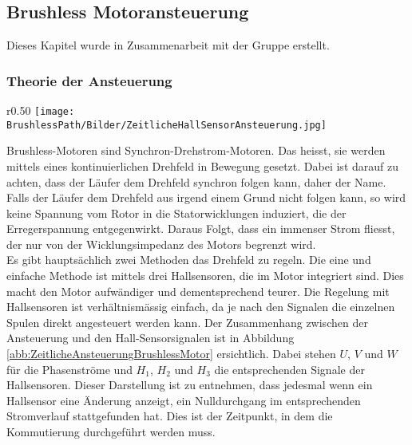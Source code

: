 \subsection{Brushless Motoransteuerung}
Dieses Kapitel wurde in Zusammenarbeit mit der Gruppe \DasAndereTeam erstellt. 
\subsubsection{Theorie der Ansteuerung}
\begin{wrapfigure}{r}{0.50\textwidth}
	\texttt{[image: \\BrushlessPath/Bilder/ZeitlicheHallSensorAnsteuerung.jpg]}
	\caption[Zeitliche Darstellung der Ansteuerung mit Hall-Sensoren]{Zeitliche Darstellung der Ansteuerung mit Hall-Sensoren \cite{AppNote:BrushlessuC}}
	\centering
    \label{abb:ZeitlicheAnsteuerungBrushlessMotor}
\end{wrapfigure}
Brushless-Motoren sind Synchron-Drehstrom-Motoren. Das heisst, sie werden mittels eines kontinuierlichen Drehfeld in Bewegung gesetzt. Dabei ist darauf zu achten, dass der Läufer dem Drehfeld synchron folgen kann, daher der Name. Falls der Läufer dem Drehfeld aus irgend einem Grund nicht folgen kann, so wird keine Spannung vom Rotor in die Statorwicklungen induziert, die der Erregerspannung entgegenwirkt. Daraus Folgt, dass ein immenser Strom fliesst, der nur von der Wicklungsimpedanz des Motors begrenzt wird.\\
Es gibt hauptsächlich zwei Methoden das Drehfeld zu regeln. Die eine und einfache Methode ist mittels drei Hallsensoren, die im Motor integriert sind. Dies macht den Motor aufwändiger und dementsprechend teurer. Die Regelung mit Hallsensoren ist verhältnismässig einfach, da je nach den Signalen die einzelnen Spulen direkt angesteuert werden kann. Der Zusammenhang zwischen der Ansteuerung und den Hall-Sensorsignalen ist in Abbildung \ref{abb:ZeitlicheAnsteuerungBrushlessMotor} ersichtlich. Dabei stehen $U$, $V$ und $W$ für die Phasenströme und $H_1$, $H_2$ und $H_3$ die entsprechenden Signale der Hallsensoren. Dieser Darstellung ist zu entnehmen, dass jedesmal wenn ein Hallsensor eine Änderung anzeigt, ein Nulldurchgang im entsprechenden Stromverlauf stattgefunden hat. Dies ist der Zeitpunkt, in dem die Kommutierung durchgeführt werden muss.
\\
